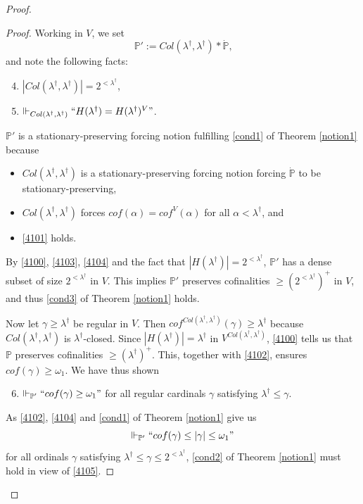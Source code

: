 \documentclass[12pt, twoside]{memoir}
\numberwithin{equation}{section}
\theoremstyle{definition}
\theoremstyle{remark}
\theoremstyle{definition}
\theoremstyle{definition}
\theoremstyle{definition}
\theoremstyle{remark}
\begin{document}
\begin{proof}
\begin{proof}
Working in $V$, we set $$\mathbb{P}' := Col(\lambda^{\dagger}, \lambda^{\dagger}) * \dot{\mathbb{P}} \text{,}$$ and note the following facts:
\begin{enumerate}[label=(\arabic*')]
    \setcounter{enumi}{3}
    \item\label{4103} $|Col(\lambda^{\dagger}, \lambda^{\dagger})| = 2^{< \lambda^{\dagger}}$,
    \item\label{4104} $\Vdash_{Col(\lambda^{\dagger}, \lambda^{\dagger})} ``H(\lambda^{\dagger}) = H(\lambda^{\dagger})^V"$.
\end{enumerate}
$\mathbb{P}'$ is a stationary-preserving forcing notion fulfilling \ref{cond1} of Theorem \ref{notion1} because 
\begin{itemize}
    \item $Col(\lambda^{\dagger}, \lambda^{\dagger})$ is a stationary-preserving forcing notion forcing $\dot{\mathbb{P}}$ to be stationary-preserving, 
    \item $Col(\lambda^{\dagger}, \lambda^{\dagger})$ forces $cof(\alpha) = cof^{V}(\alpha)$ for all $ \alpha < \lambda^{\dagger}$, and
    \item \ref{4101} holds.
\end{itemize}

By \ref{4100}, \ref{4103}, \ref{4104} and the fact that $|H(\lambda^{\dagger})| = 2^{< \lambda^{\dagger}}$, $\mathbb{P}'$ has a dense subset of size $2^{< \lambda^{\dagger}}$ in $V$. This implies $\mathbb{P}'$ preserves cofinalities $\geq (2^{< \lambda^{\dagger}})^+$ in $V$, and thus \ref{cond3} of Theorem  \ref{notion1} holds.

Now let $\gamma \geq \lambda^{\dagger}$ be regular in $V$. Then $cof^{Col(\lambda^{\dagger}, \lambda^{\dagger})} (\gamma) \geq \lambda^{\dagger}$ because $Col(\lambda^{\dagger}, \lambda^{\dagger})$ is $\lambda^{\dagger}$-closed. Since $|H(\lambda^{\dagger})| = \lambda^{\dagger}$ in $V^{Col(\lambda^{\dagger}, \lambda^{\dagger})}$, \ref{4100} tells us that $\mathbb{P}$ preserves cofinalities $\geq (\lambda^{\dagger})^+$. This, together with \ref{4102}, ensures $cof(\gamma) \geq \omega_1$. We have thus shown
\begin{enumerate}[label=(\arabic*')]
    \setcounter{enumi}{5}
    \item\label{4105} $\Vdash_{\mathbb{P}'} ``cof(\gamma) \geq \omega_1"$ for all regular cardinals $\gamma$ satisfying $\lambda^{\dagger} \leq \gamma$.
\end{enumerate}
As \ref{4102}, \ref{4104} and \ref{cond1} of Theorem \ref{notion1} give us $$\Vdash_{\mathbb{P}'} ``cof(\gamma) \leq |\gamma| \leq \omega_1"$$ for all ordinals $\gamma$ satisfying $\lambda^{\dagger} \leq \gamma \leq 2^{< \lambda^{\dagger}}$, \ref{cond2} of Theorem \ref{notion1} must hold in view of \ref{4105}.
\end{proof}


\end{proof}
\end{document}
